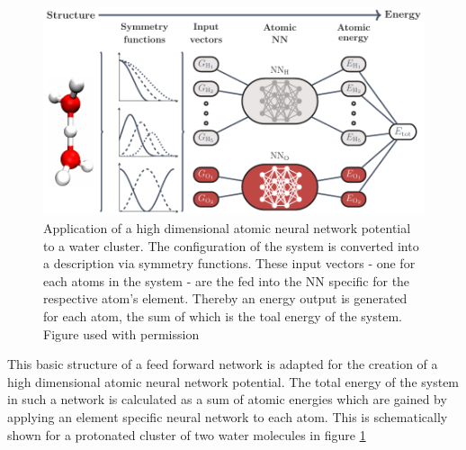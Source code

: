 \documentclass[12pt,titlepage]{article}
\begin{document}
\begin{figure}
	\includegraphics[width=\linewidth]{plot.pdf}
	\caption{Application of a high dimensional atomic neural network potential to a water cluster. The configuration of the system is converted into a description via symmetry functions. These input vectors - one for each atoms in the system - are the fed into the NN specific for the respective atom's element. Thereby an energy output is generated for each atom, the sum of which is the toal energy of the system. Figure used with permission\cite{Schran2019}}
	\label{application of neural network}
\end{figure}



This basic structure of a feed forward network is adapted for the creation of a high dimensional atomic neural network potential. The total energy of the system in such a network is calculated as a sum of atomic energies which are gained by applying an element specific neural network to each atom. This is schematically shown for a protonated cluster of two water molecules in figure \ref{application of neural network}
\end{document}
